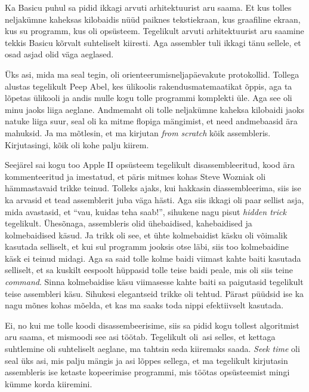 
Ka Basicu puhul sa pidid ikkagi  arvuti arhitektuurist aru saama. Et kus 
tolles neljakümne kaheksas kilobaidis nüüd paiknes tekstiekraan, kus  
graafiline ekraan, kus  su programm, kus oli opsüsteem. Tegelikult 
arvuti arhitektuurist aru saamine tekkis Basicu kõrvalt suhteliselt kiiresti. Aga 
assembler tuli ikkagi tänu sellele, et osad asjad olid väga aeglased. 

Üks asi, 
mida ma seal tegin, oli orienteerumisneljapäevakute protokollid. Tollega 
alustas tegelikult Peep Abel, kes ülikoolis 
rakendusmatemaatikat õppis, aga ta lõpetas ülikooli ja andis mulle kogu 
tolle programmi komplekti üle. Aga see oli minu jaoks liiga aeglane. Andmemaht 
oli tolle  neljakümne kaheksa kilobaidi jaoks natuke liiga suur, seal oli ka 
mitme flopiga mängimist, et need andmebaasid ära mahuksid. Ja ma mõtlesin, 
et ma kirjutan \emph{from scratch} kõik assembleris. Kirjutasingi, kõik oli 
kohe palju kiirem. 

Seejärel sai kogu too Apple II opsüsteem tegelikult disassembleeritud, kood ära 
kommenteeritud ja  imestatud, et päris mitmes kohas Steve Wozniak oli 
hämmastavaid trikke teinud. Tolleks ajaks, 
kui hakkasin diassembleerima, siis ise ka arvasid et tead assemblerit juba 
väga hästi. Aga siis ikkagi oli paar sellist asja, mida avastasid, et 
\enquote{vau, kuidas teha saab!}, sihukene nagu  pisut \emph{hidden trick} 
tegelikult. Ühesõnaga, assembleris olid ühebaidised, kahebaidised ja 
kolmebaidised käsud. Ja trikk oli see, et ühte kolmebaidist käsku oli võimalik 
kasutada selliselt, et kui sul programm jooksis otse läbi, siis too 
kolmebaidine käsk ei teinud midagi. Aga sa said tolle kolme baidi viimast 
kahte baiti kasutada selliselt, et sa kuskilt eespoolt hüppasid tolle teise 
baidi peale, mis oli siis teine \emph{command}. Sinna kolmebaidise käsu 
viimasesse kahte baiti sa paigutasid tegelikult teise assembleri käsu. Sihukesi 
elegantseid trikke oli tehtud. Pärast püüdsid ise ka nagu mõnes kohas mõelda, 
et kas ma saaks toda nippi efektiivselt kasutada.


Ei, no kui me tolle koodi disassembeerisime, siis sa pidid kogu tollest 
algoritmist aru saama, et mismoodi see asi töötab. Tegelikult oli asi selles, 
et kettaga suhtlemine oli suhteliselt aeglane, ma tahtsin seda kiiremaks saada. 
\emph{Seek time} oli seal üks asi, mis palju mängis ja asi lõppes sellega, et 
ma tegelikult kirjutasin assembleris ise ketaste kopeerimise programmi, mis 
töötas  opsüsteemist mingi kümme korda kiiremini. 

